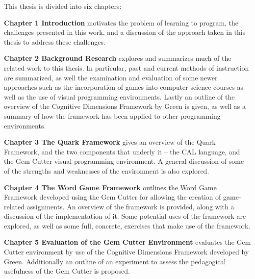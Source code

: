 This thesis is divided into six chapters:  


\textbf{Chapter 1 Introduction} motivates the problem of learning to program, the challenges presented in this work, and a discussion of the approach taken in this thesis to address these challenges.


\textbf{Chapter 2 Background Research} explores and summarizes much of the related work to this thesis.  In particular, past and current methods of instruction are summarized, as well the examination and evaluation of some newer approaches such as the incorporation of games into computer science courses as well as the use of visual programming environments.  Lastly an outline of the overview of the Cognitive Dimensions Framework by Green is given, as well as a summary of how the framework has been applied to other programming environments.

\textbf{Chapter 3 The Quark Framework} gives an overview of the Quark Framework, and the two components that underly it -- the CAL language, and the Gem Cutter visual programming environment.  A general discussion of some of the strengths and weaknesses of the environment is also explored.

	
\textbf{Chapter 4 The Word Game Framework} outlines the Word Game Framework developed using the Gem Cutter for allowing the creation of game-related assignments.  An overview of the framework is provided, along with a discussion of the implementation of it.  Some potential uses of the framework are explored, as well as some full, concrete, exercises that make use of the framework.


\textbf{Chapter 5 Evaluation of the Gem Cutter Environment} evaluates the Gem Cutter environment by use of the Cognitive Dimensions Framework developed by Green.  Additionally an outline of an experiment to assess the pedagogical usefulness of the Gem Cutter is proposed.

